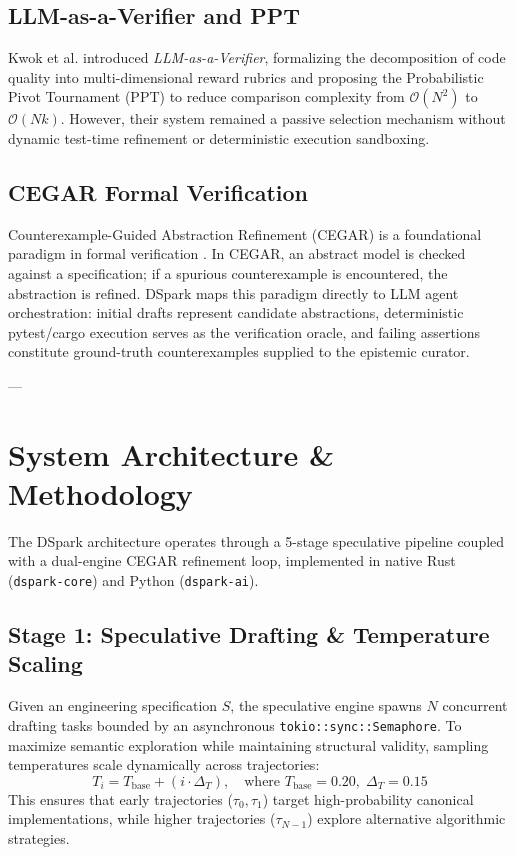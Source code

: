 \documentclass[10pt,twocolumn,letterpaper]{article}
\begin{document}
\subsection{LLM-as-a-Verifier and PPT}
Kwok et al. \cite{kwok2026llm} introduced \textit{LLM-as-a-Verifier}, formalizing the decomposition of code quality into multi-dimensional reward rubrics and proposing the Probabilistic Pivot Tournament (PPT) to reduce comparison complexity from $\mathcal{O}(N^2)$ to $\mathcal{O}(Nk)$. However, their system remained a passive selection mechanism without dynamic test-time refinement or deterministic execution sandboxing.

\subsection{CEGAR Formal Verification}
Counterexample-Guided Abstraction Refinement (CEGAR) is a foundational paradigm in formal verification \cite{clarke2000counterexample}. In CEGAR, an abstract model is checked against a specification; if a spurious counterexample is encountered, the abstraction is refined. DSpark maps this paradigm directly to LLM agent orchestration: initial drafts represent candidate abstractions, deterministic pytest/cargo execution serves as the verification oracle, and failing assertions constitute ground-truth counterexamples supplied to the epistemic curator.

---

\section{System Architecture \& Methodology}

The DSpark architecture operates through a 5-stage speculative pipeline coupled with a dual-engine CEGAR refinement loop, implemented in native Rust (\texttt{dspark-core}) and Python (\texttt{dspark-ai}).

\subsection{Stage 1: Speculative Drafting \& Temperature Scaling}
Given an engineering specification $S$, the speculative engine spawns $N$ concurrent drafting tasks bounded by an asynchronous \texttt{tokio::sync::Semaphore}. To maximize semantic exploration while maintaining structural validity, sampling temperatures scale dynamically across trajectories:
\begin{equation}
T_i = T_{\text{base}} + (i \cdot \Delta_T), \quad \text{where } T_{\text{base}} = 0.20, \; \Delta_T = 0.15
\end{equation}
This ensures that early trajectories ($\tau_0, \tau_1$) target high-probability canonical implementations, while higher trajectories ($\tau_{N-1}$) explore alternative algorithmic strategies.
\end{document}

